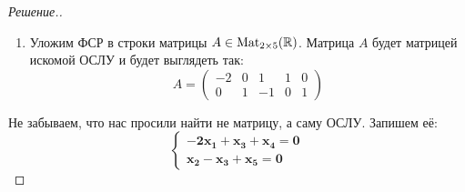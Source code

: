 \documentclass[a4paper]{article}
\makeatletter
\newcommand{\Mat}{\operatorname{Mat}}
\theoremstyle{remark}
\newenvironment{sysmatrix}[1]
{
    \left(\begin{array}{@{}#1@{}}
}
{\end{array}\right)}
\newcommand{\smt}[2]{\begin{sysmatrix}{#1} #2\end{sysmatrix}}
\newcommand{\elth}[2]{%
  \ensuremath{\text{Э}_3(#1,\; #2)}%
}
\newcommand{\arron}[3]{%
  \ensuremath{\xrightarrow{\text{Э}_1(#1,\; #2,\; #3)}}%
}
\newcommand{\arrth}[2]{%
  \ensuremath{\xrightarrow{\text{Э}_3(#1,\; #2)}}%
}
\makeatother
\begin{document}
\begin{proof}[Решение.]
\begin{enumerate}
\begin{multline*}
{              1 & 2 & 2 & 0 & 0 & 0 \\
              0 & -1 & -1 & 1 & 0 & 0 \\
              0 & 0 & 2 & -2 & 2 & 0
            } \overset{\elth{2}{-1}}{\arrth{3}{1/2}} \smt{ccccc|c}{
              1 & 2 & 2 & 0 & 0 & 0 \\
              0 & 1 & 1 & -1 & 0 & 0 \\
              0 & 0 & 1 & -1 & 1 & 0
            } \arron{1}{2}{-2} \smt{ccccc|c}{
              1 & 0 & 0 & 2 & 0 & 0 \\
              0 & 1 & 1 & -1 & 0 & 0 \\
              0 & 0 & 1 & -1 & 1 & 0
            } \to\\
            {\arron{2}{3}{-1}} \smt{ccccc|c}{
              1 & 0 & 0 & 2 & 0 & 0 \\
              0 & 1 & 0 & 0 & -1 & 0 \\
              0 & 0 & 1 & -1 & 1 & 0
            }
          \end{multline*}
          Дальше легко восстановить решение ОСЛУ, но нас интересует ФСР. Она будет выглядеть следующим образом:
          \begin{equation*}
            u_1 = \begin{pmatrix}
              -2 \\
              0 \\
              1 \\
              1 \\
              0
            \end{pmatrix},\ u_2 = \begin{pmatrix}
              0 \\
              1 \\
              -1 \\
              0 \\
              1
            \end{pmatrix}
          \end{equation*}
          \item Уложим ФСР в строки матрицы $A \in \Mat_{2 \times 5}(\RR)$. Матрица $A$ будет матрицей искомой ОСЛУ и будет выглядеть так:
          \begin{equation*}
            A = \begin{pmatrix}
              -2 & 0 & 1 & 1 & 0 \\
              0 & 1 & -1 & 0 & 1
            \end{pmatrix}
          \end{equation*}
        \end{enumerate}
        Не забываем, что нас просили найти не матрицу, а саму ОСЛУ. Запишем её:
        \begin{equation*}
          \begin{cases}
            \bm{-2x_1 + x_3 + x_4 = 0} \\
            \bm{x_2 - x_3 + x_5 = 0}
          \end{cases}
        \end{equation*} 
      \end{proof}
\end{document}

